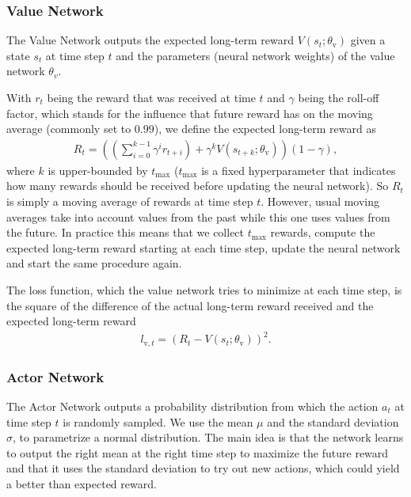 \documentclass[sigconf]{acmart}
\newcommand\note[2]{{\color{#1}#2}}
\newcommand\todo[1]{{\note{red}{TODO: #1}}}
\begin{document}
\subsubsection{Value Network}
\label{subsubsec:genericvalue}

The Value Network outputs the expected long-term reward $V(s_{t}; \theta_\text{v})$ given a state $s_t$ at time step $t$ and the parameters (neural network weights) of the value network $\theta_v$.

With $r_t$ being the reward that was received at time $t$ and $\gamma$ being the roll-off factor, which stands for the influence that future reward has on the moving average (commonly set to $0.99$), we define the expected long-term reward as 
\begin{align*}
R_t = \left(\left(\sum_{i=0}^{k-1} \gamma^ir_{t+i}\right) + \gamma^k V(s_{t+k}; \theta_\text{v})\right)\left( 1-\gamma \right),
\end{align*}
where $k$ is upper-bounded by $t_\text{max}$ ($t_\text{max}$ is a fixed hyperparameter that indicates how many rewards should be received before updating the neural network). So $R_t$ is simply a moving average of rewards at time step $t$. However, usual moving averages take into account values from the past while this one uses values from the future. In practice this means that we collect $t_\text{max}$ rewards, compute the expected long-term reward starting at each time step, update the neural network and start the same procedure again. 


The loss function, which the value network tries to minimize at each time step, is the square of the difference of the actual long-term reward received and the expected long-term reward
\begin{align*}
l_{\text{v},t} = \left(R_t - V(s_t; \theta_\text{v})\right)^2.
\end{align*}

\subsubsection{Actor Network}
\label{subsubsec:genericactor}

The Actor Network outputs a probability distribution from which the action $a_t$ at time step $t$ is randomly sampled. We use the mean $\mu$ and the standard deviation $\sigma$, to parametrize a normal distribution. The main idea is that the network learns to output the right mean at the right time step to maximize the future reward and that it uses the standard deviation to try out new actions, which could yield a better than expected reward. 
\end{document}
